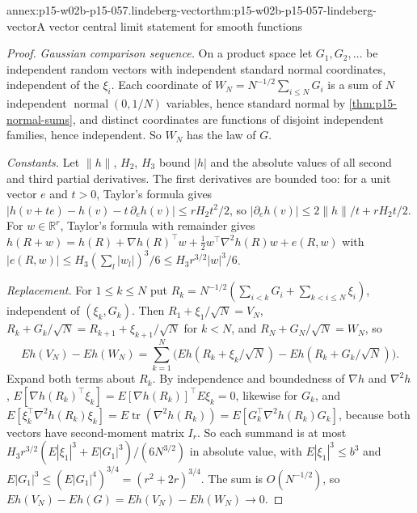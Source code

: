 \begin{annexitem}{annex:p15-w02b-p15-057.lindeberg-vector}{thm:p15-w02b-p15-057-lindeberg-vector}{A vector central limit statement for smooth functions}
\begin{proof}
\emph{Gaussian comparison sequence.} On a product space let
\(G_1,G_2,\ldots\) be independent random vectors with independent standard
normal coordinates, independent of the \(\xi_i\). Each coordinate of
\(W_N=N^{-1/2}\sum_{i\leq N}G_i\) is a sum of \(N\) independent
\(\operatorname{normal}(0,1/N)\) variables, hence standard normal by
\cref{thm:p15-normal-sums}, and distinct coordinates are functions of
disjoint independent families, hence independent. So \(W_N\) has the law of
\(G\).

\emph{Constants.} Let \(\|h\|\), \(H_2\), \(H_3\) bound \(|h|\) and the
absolute values of all second and third partial derivatives. The first
derivatives are bounded too: for a unit vector \(e\) and \(t>0\), Taylor's
formula gives \(|h(v+te)-h(v)-t\,\partial_eh(v)|\leq rH_2t^2/2\), so
\(|\partial_eh(v)|\leq2\|h\|/t+rH_2t/2\). For \(w\in\mathbb R^r\), Taylor's
formula with remainder gives
\(h(R+w)=h(R)+\nabla h(R)^{\top}w+\tfrac12w^{\top}\nabla^2h(R)w+e(R,w)\) with
\(|e(R,w)|\leq H_3(\sum_l|w_l|)^3/6\leq H_3r^{3/2}|w|^3/6\).

\emph{Replacement.} For \(1\leq k\leq N\) put
\(R_k=N^{-1/2}(\sum_{i<k}G_i+\sum_{k<i\leq N}\xi_i)\), independent of
\((\xi_k,G_k)\). Then \(R_1+\xi_1/\sqrt N=V_N\),
\(R_k+G_k/\sqrt N=R_{k+1}+\xi_{k+1}/\sqrt N\) for \(k<N\), and
\(R_N+G_N/\sqrt N=W_N\), so
\[
 Eh(V_N)-Eh(W_N)=\sum_{k=1}^N\bigl(Eh(R_k+\xi_k/\sqrt N)-Eh(R_k+G_k/\sqrt N)\bigr).
\]
Expand both terms about \(R_k\). By independence and boundedness of
\(\nabla h\) and \(\nabla^2h\),
\(E[\nabla h(R_k)^{\top}\xi_k]=E[\nabla h(R_k)]^{\top}E\xi_k=0\), likewise for
\(G_k\), and
\(E[\xi_k^{\top}\nabla^2h(R_k)\xi_k]=E\operatorname{tr}(\nabla^2h(R_k))
=E[G_k^{\top}\nabla^2h(R_k)G_k]\), because both vectors have second-moment
matrix \(I_r\). So each summand is at most
\(H_3r^{3/2}(E|\xi_1|^3+E|G_1|^3)/(6N^{3/2})\) in absolute value, with
\(E|\xi_1|^3\leq b^3\) and \(E|G_1|^3\leq(E|G_1|^4)^{3/4}=(r^2+2r)^{3/4}\).
The sum is \(O(N^{-1/2})\), so \(Eh(V_N)-Eh(G)=Eh(V_N)-Eh(W_N)\to0\).


\end{proof}
\end{annexitem}
